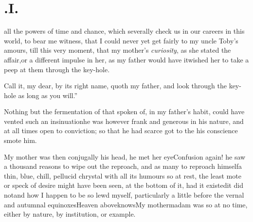 \documentclass{article}
\begin{document}
\section{.\enspace I.}

 all the powers of time and
chance, which severally check us in our careers in this world, to
bear me witness, that I could never yet get fairly to my uncle
Toby’s amours, till this very moment, that my
mother’s \textit{curiosity}, as she stated the
affair,\tsk\tsk or a different impulse in her, as my father
would have it\tsh wished her to take a peep at them
through the key-hole.

\lqq Call it, my dear, by its right name, quoth my
father, and look through the key-hole as long as you
will.”

Nothing but the fermentation of that
spoken of, in my father’s habit, could
have vented such an insinuation\tsh he was however frank
and generous in his nature, and at all times open to conviction; so
that he had scarce got to the 
\break
his conscience smote him.

My mother was then conjugally 
his head, he met her eye\tsh Confusion again! he saw a thousand reasons to wipe out
the reproach, and as many to reproach himself\tsh a thin, blue, chill, pellucid
chrystal with all its humours so at rest, the least mote or speck of desire might
have been seen, at the bottom of it, had it existed\tsh it did not\tsh and how I
happen to be so lewd myself, particularly a little before the vernal and\break
autumnal equinoxes\tsh Heaven above\break knows\tsh My mother\tsh madam\break\tsh
was so at no time, either by nature, by institution, or example.
\end{document}
